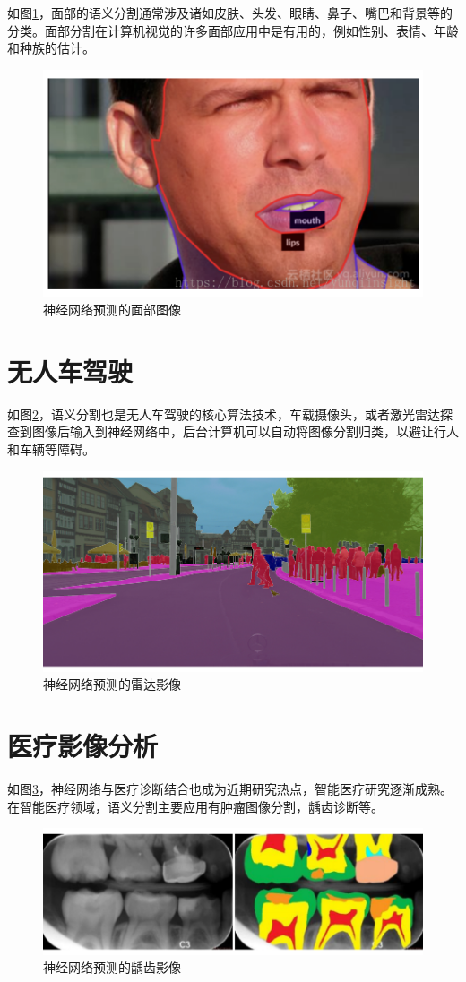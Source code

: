 如图\ref{fig::apply_pic2}，面部的语义分割通常涉及诸如皮肤、头发、眼睛、鼻子、嘴巴和背景等的分类。面部分割在计算机视觉的许多面部应用中是有用的，例如性别、表情、年龄和种族的估计。
\begin{figure}[htbp]
\centering
\includegraphics[width=1\linewidth]{body/apply_pic/2}
\caption{神经网络预测的面部图像}
\label{fig::apply_pic2}
\end{figure}

\section{无人车驾驶}

如图\ref{fig::apply_pic3}，语义分割也是无人车驾驶的核心算法技术，车载摄像头，或者激光雷达探查到图像后输入到神经网络中，后台计算机可以自动将图像分割归类，以避让行人和车辆等障碍。
\begin{figure}[htbp]
\centering
\includegraphics[width=1\linewidth]{body/apply_pic/3}
\caption{神经网络预测的雷达影像}
\label{fig::apply_pic3}
\end{figure}

\section{医疗影像分析}

如图\ref{fig::apply_pic4}，神经网络与医疗诊断结合也成为近期研究热点，智能医疗研究逐渐成熟。在智能医疗领域，语义分割主要应用有肿瘤图像分割，龋齿诊断等。
\begin{figure}[htbp]
\centering
\includegraphics[width=1\linewidth]{body/apply_pic/4}
\caption{神经网络预测的龋齿影像}
\label{fig::apply_pic4}
\end{figure}

